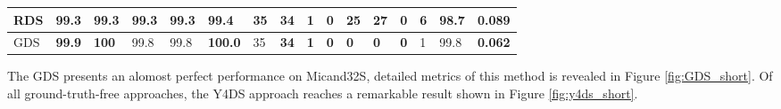 \begin{table}[]
{\begin{tabular}{|l|l|l|l|l|l|l|l|l|l|l|l|l|l|l|l|}
			RDS    & 99.3                                                 & 99.3                                                & 99.3                                                & 99.3                                                   & 99.4                                                   & 35                                                   & \textbf{34} & \textbf{1}                                           & \textbf{0} & 25         & 27         & \textbf{0} & 6          & 98.7                                                 & 0.089          \\ \hline
			GDS    & \textbf{99.9}                                        & \textbf{100}                                        & 99.8                                                & 99.8                                                   & \textbf{100.0}                                         & 35                                                   & \textbf{34} & \textbf{1}                                           & \textbf{0} & \textbf{0} & \textbf{0} & \textbf{0} & 1          & 99.8                                                 & \textbf{0.062} \\ \hline
		\end{tabular}%
	}
\end{table}
The GDS presents an alomost perfect performance on Micand32S, detailed metrics of this method is revealed in Figure \ref{fig:GDS_short}. Of all ground-truth-free approaches, the Y4DS approach reaches a remarkable result shown in Figure \ref{fig:y4ds_short}.
